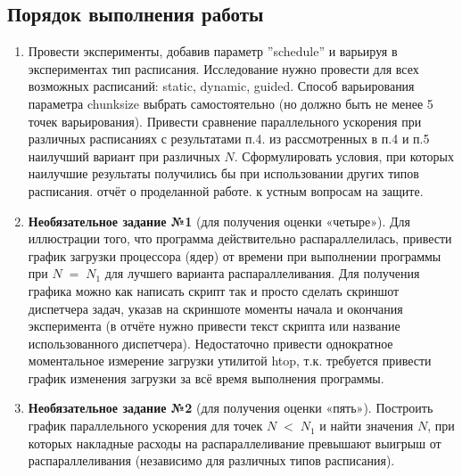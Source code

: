 { %
	\subsection{Порядок выполнения работы}
	\begin{enumerate}
		 во все for-циклы в программе из ЛР №1 следующую директиву OpenMP: \\	
''\#pragma omp parallel for default(none) private(...) shared(...)''. Наличие всех перечисленных параметров в указанной директиве является обязательным.
		 все for-циклы на внутренние зависимости по данным между итерациями. Если зависимости обнаружились, использовать для защиты критических секций директиву ''\#pragma omp critical'' или ''\#pragma omp atomic'' (если операция атомарна), или параметр reduction (предпочтительнее) или вообще отказаться от распараллеливания цикла (свой выбор необходимо обосновать).
		, что получившаяся программа обладает свойством прямой совместимости с компиляторами, не поддерживающими \\OpenMP (для проверки этого можно скомпилировать программу без опции ''–fopenmp'', в результате не должно быть сообщений об ошибках, а программа должна корректно работать).
		 эксперименты, замеряя параллельное ускорение. Привести сравнение графиков параллельного ускорения с ЛР №1 и ЛР №2.  
		\item Провести эксперименты, добавив параметр ''schedule'' и варьируя в экспериментах тип расписания. Исследование нужно провести для всех возможных расписаний: static, dynamic, guided. Способ варьирования параметра chunk\textunderscore size выбрать самостоятельно (но должно быть не менее 5 точек варьирования). Привести сравнение параллельного ускорения при различных расписаниях с результатами п.4.
		 из рассмотренных в п.4 и п.5 наилучший вариант при различных $N$. Сформулировать условия, при которых наилучшие результаты получились бы при использовании других типов расписания.
		 отчёт о проделанной работе.
		 к устным вопросам на защите.
		\item\textbf{Необязательное задание №1} (для получения оценки «четыре»). Для иллюстрации того, что программа действительно распараллелилась, привести график загрузки процессора (ядер) от времени при выполнении программы при $N\;=\;N_1$ для лучшего варианта распараллеливания. Для получения графика можно как написать скрипт 
так и просто сделать скриншот диспетчера задач, указав на скриншоте моменты начала и окончания эксперимента (в отчёте нужно привести текст скрипта или название использованного диспетчера). Недостаточно привести однократное  моментальное измерение загрузки утилитой htop, т.к. требуется привести график изменения загрузки за всё время выполнения программы.
		\item\textbf{Необязательное задание №2} (для получения оценки «пять»). Построить график параллельного ускорения для точек $N\;<\;N_1$ и найти значения $N$, при которых накладные расходы на распараллеливание превышают выигрыш от распараллеливания (независимо для различных типов расписания).
	\end{enumerate}
}